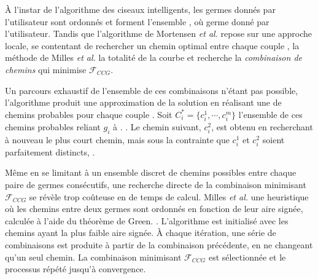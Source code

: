 À l'instar de l'algorithme des ciseaux intelligents, les germes donnés par l'utilisateur sont ordonnés et forment l'ensemble , où germe donné par l'utilisateur. Tandis que l'algorithme de Mortensen \textit{et al.} repose sur une approche locale, se contentant de rechercher un chemin optimal entre chaque couple , la méthode de Milles \textit{et al.}  la totalité de la courbe et recherche la \emph{combinaison de chemins} qui minimise $\mathcal{F}_{CCG}$. 


Un parcours exhaustif de l'ensemble de ces combinaisons n'étant pas possible, l'algorithme produit une approximation de la solution en réalisant une  de chemins probables pour chaque couple . Soit $C_{i}^{*}=\lbrace c_{i}^{1}, \cdots, c_{i}^{m} \rbrace$ l'ensemble de ces chemins probables reliant $g_{i}$ à . . Le chemin suivant, $c_{i}^{2}$, est obtenu en recherchant à nouveau le plus court chemin, mais sous la contrainte que  $c_{i}^{1}$ et  $c_{i}^{2}$ soient parfaitement distincts, . 

Même en se limitant à un ensemble discret de chemins possibles entre chaque paire de germes consécutifs, une recherche directe de la combinaison minimisant $\mathcal{F}_{CCG}$ se révèle trop coûteuse en  de temps de calcul. Milles \textit{et al.}  une heuristique où les chemins entre deux germes sont ordonnés en fonction de leur aire signée, calculée à l'aide du théorème de Green. .  L'algorithme est initialisé avec les chemins ayant la plus faible aire signée. À chaque itération, une série de combinaisons est produite à partir de la combinaison précédente, en ne changeant qu'un seul chemin. La combinaison minimisant $\mathcal{F}_{CCG}$ est sélectionnée et le processus répété jusqu'à convergence.  

